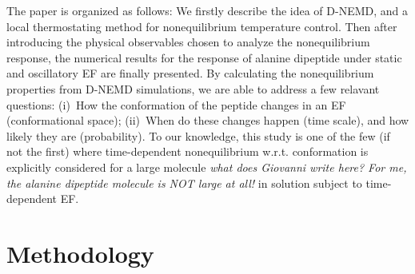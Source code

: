 \documentclass[a4paper,preprint,unsortedaddress,onecolumn]{revtex4-1}
\newcommand{\recheck}[1]{{\color{red} #1}}
\newcommand{\bluec}[1]{{\color{blue} #1}}
\begin{document}
The paper is organized as follows:
\recheck{
  We firstly describe the idea of D-NEMD, and a local thermostating method
for nonequilibrium temperature control.
Then
after introducing the physical
observables chosen to analyze the nonequilibrium response,
the numerical results for the response of alanine
dipeptide under static and oscillatory EF are
finally presented.} By calculating the nonequilibrium properties from D-NEMD
simulations, we are able to address
a few relavant questions: (i)~How the conformation of the peptide
changes in an EF (conformational space);
(ii)~When do these changes happen (time scale),
and how likely they are (probability). 
To our knowledge, this study is one of the few (if not the first)  where
time-dependent nonequilibrium w.r.t. conformation
is explicitly considered for a \bluec{large molecule \textit{what does Giovanni write here? For me, the alanine dipeptide molecule is NOT large at all!}}
in solution subject to time-dependent EF.



\section{Methodology}
\end{document}
